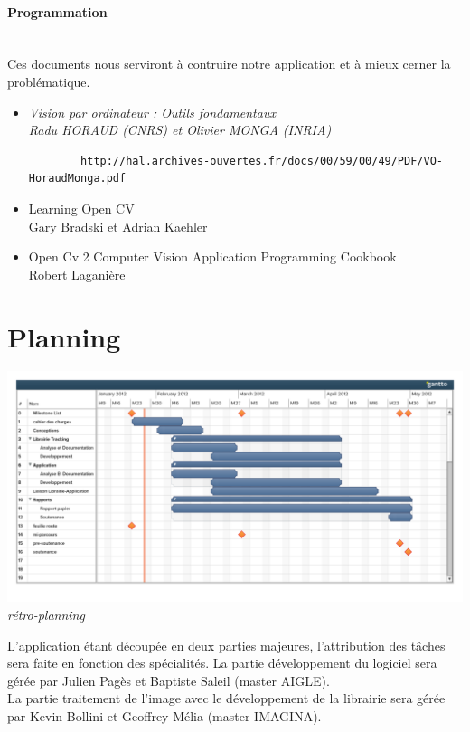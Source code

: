 \documentclass{article}
\begin{document}
	\paragraph{Programmation} \ \\
	Ces documents nous serviront à contruire notre application et à mieux cerner la problématique. \\	
	\begin{itemize}
		\item \it{Vision par ordinateur : Outils fondamentaux} \\
		Radu HORAUD (CNRS) et Olivier MONGA (INRIA)
		\begin{verbatim}
		http://hal.archives-ouvertes.fr/docs/00/59/00/49/PDF/VO-HoraudMonga.pdf
		\end{verbatim}
		\item Learning Open CV \\
		 Gary Bradski et Adrian Kaehler
		\item Open Cv 2 Computer Vision Application Programming Cookbook\\
		Robert Laganière
	\end{itemize}

	\section{Planning}
	\begin{center}
		\includegraphics[scale=0.37]{retroplanning.pdf}
		\it rétro-planning
	\end{center}
	
	L'application étant découpée en deux parties majeures, l'attribution des tâches sera faite en fonction des spécialités.
	La partie développement du logiciel sera gérée par Julien Pagès et Baptiste Saleil (master AIGLE). \\
	La partie traitement de l'image avec le développement de la librairie sera gérée par Kevin Bollini et Geoffrey Mélia 
	(master IMAGINA).	
\end{document}
